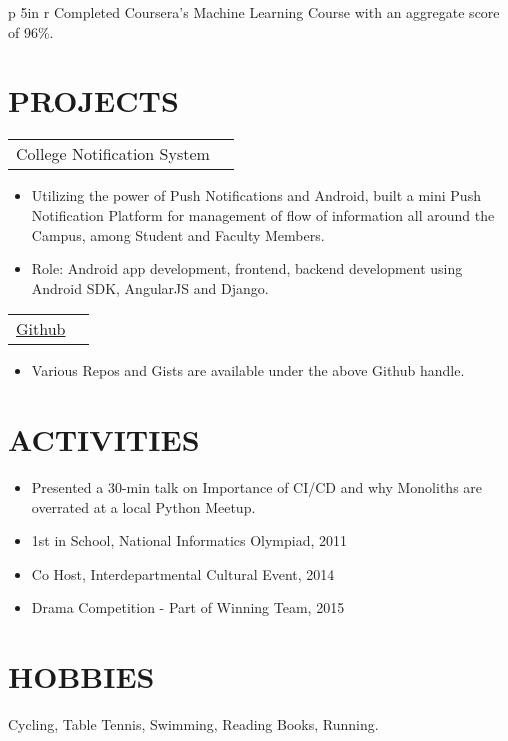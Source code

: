 \documentclass[margin]{res}
\begin{document}
\begin{resume}
\begin{tabular}{p {5in} r}
                  Completed Coursera's Machine Learning Course with an aggregate score of 96\%.
                  \end{tabular}
\section{PROJECTS}
				 \begin{tabular}{p{5in} r} %
                 College Notification System
                 \end{tabular}
                  \begin{itemize}
                   \item[] Utilizing the power of Push Notifications and Android, built a mini Push Notification Platform for management of flow of information all around the Campus, among Student and Faculty Members.
                   \item[] Role: Android app development, frontend, backend development using Android SDK, AngularJS and Django.
                  \end{itemize}
				 \begin{tabular}{p{5in} r} %
                 \href {www.github.com/SehgalDivij}{Github}
                 \end{tabular}
                  \begin{itemize}
                   \item[] Various Repos and Gists are available under the above Github handle.
                  \end{itemize}
\section{ACTIVITIES}
 \begin{itemize}
 \item Presented a 30-min talk on Importance of CI/CD and why Monoliths are overrated at a local Python Meetup.
 \end{itemize}
 \begin{itemize}
 \item 1st in School, National Informatics Olympiad, 2011
 \end{itemize}
  \begin{itemize}
 \item Co Host, Interdepartmental Cultural Event, 2014
 \end{itemize}
  \begin{itemize}
 \item Drama Competition - Part of Winning Team, 2015
 \end{itemize}
 
\section{HOBBIES}         Cycling, Table Tennis, Swimming, Reading Books, Running.
 
\end{resume} 
\end{document}
